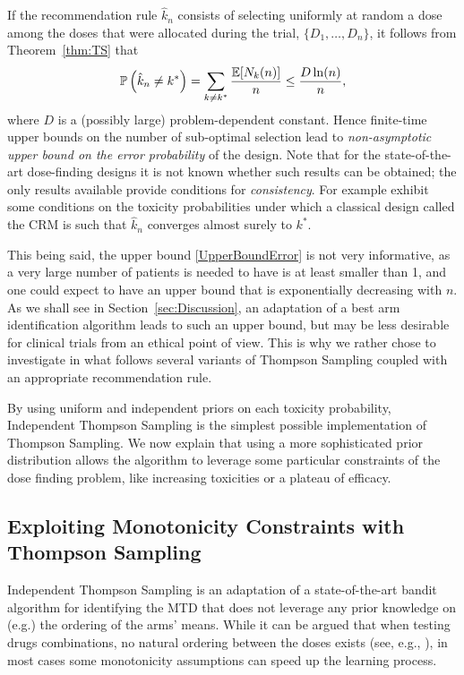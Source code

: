 If the recommendation rule $\hat{k}_n$ consists of selecting uniformly at random a dose among the doses that were allocated during the trial,  $\{D_1,\dots,D_n\}$, it follows from Theorem~\ref{thm:TS} that 
\begin{equation}\mathbb{P}\left(\hat k_n \neq k^*\right) = \sum_{k \neq k^*} \frac{\mathbb{E}[N_k(n)]}{n} \leq \frac{D\ln(n)}{n},\label{UpperBoundError}\end{equation}
where $D$ is a (possibly large) problem-dependent constant. Hence finite-time upper bounds on the number of sub-optimal selection lead to \emph{non-asymptotic upper bound on the error probability} of the design. Note that for the state-of-the-art dose-finding designs it is not known whether such results can be obtained; the only results available provide conditions for \emph{consistency}. For example \cite{ShenOQuigley96,CheungChappell02} exhibit some conditions on the toxicity probabilities under which a classical design called the CRM is such that $\hat{k}_n$ converges almost surely to $k^*$. 

This being said, the upper bound \eqref{UpperBoundError} is not very informative, as a very large number of patients is needed to have is at least smaller than 1, and one could expect to have an upper bound that is exponentially decreasing with $n$. As we shall see in Section~\ref{sec:Discussion}, an adaptation of a best arm identification algorithm \citep{Karnin13} leads to such an upper bound, but may be less desirable for clinical trials from an ethical point of view. This is why we rather chose to investigate in what follows several variants of Thompson Sampling coupled with an appropriate recommendation rule. 



By using uniform and independent priors on each toxicity probability, Independent Thompson Sampling is the simplest possible implementation of Thompson Sampling. We now explain that using a more sophisticated prior distribution allows the algorithm to leverage some particular constraints of the dose finding problem, like increasing toxicities or a plateau of efficacy.  



\subsection{Exploiting Monotonicity Constraints with Thompson Sampling}\label{sec:TS}

Independent Thompson Sampling is an adaptation of a state-of-the-art bandit algorithm for identifying the MTD that does not leverage any prior knowledge on (e.g.) the ordering of the arms' means. While it can be argued that when testing drugs combinations, no natural ordering between the doses exists (see, e.g., \cite{Mozgunov17CT}), in most cases some monotonicity assumptions can speed up the learning process. 

